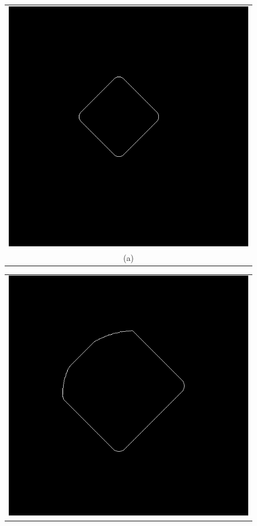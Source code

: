 \begin{figure}[h!]
\centering
\begin{minipage}{.49\textwidth}
\begin{tabular}{c}
\includegraphics[width=.9\textwidth]{results/circleZero700} \\
(a)
\end{tabular}
\end{minipage}
\begin{minipage}{.49\textwidth}
\begin{tabular}{c}
\includegraphics[width=.9\textwidth]{results/circleZero1200} \\

\end{tabular}
\end{minipage}
\end{figure}

